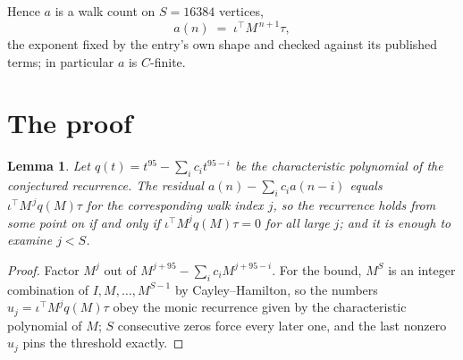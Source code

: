 \documentclass[11pt,a4paper]{article}
\theoremstyle{plain}
\newtheorem{lemma}[theorem]{Lemma}
\theoremstyle{definition}
\begin{document}
Hence $a$ is a walk count on $S=16384$ vertices,
\[
a(n)\;=\;\iota^{\!\top}M^{\,n+1}\tau ,
\]
the exponent fixed by the entry's own shape and checked against its published terms; in
particular $a$ is $C$-finite.

\section{The proof}

\begin{lemma}\label{lem:crit}
Let $q(t)=t^{95}-\sum_i c_it^{95-i}$ be the characteristic polynomial of the
conjectured recurrence. The residual $a(n)-\sum_ic_ia(n-i)$ equals
$\iota^{\!\top}M^{\,j}q(M)\tau$ for the corresponding walk index $j$, so the recurrence
holds from some point on if and only if $\iota^{\!\top}M^{j}q(M)\tau=0$ for all large $j$;
and it is enough to examine $j<S$.
\end{lemma}

\begin{proof}
Factor $M^{j}$ out of $M^{j+95}-\sum_ic_iM^{j+95-i}$. For the bound, $M^{S}$
is an integer combination of $I,M,\dots,M^{S-1}$ by Cayley--Hamilton, so the numbers
$u_j=\iota^{\!\top}M^{j}q(M)\tau$ obey the monic recurrence given by the characteristic
polynomial of $M$; $S$ consecutive zeros force every later one, and the last nonzero $u_j$
pins the threshold exactly.
\end{proof}
\end{document}
